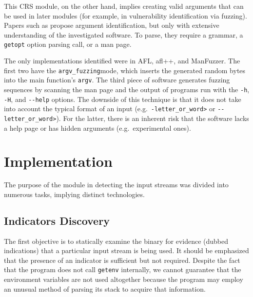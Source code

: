 \documentclass[../main.tex]{subfiles}
\begin{document}
This CRS module, on the other hand, implies creating valid arguments that can
be used in later modules (for example, in vulnerability identification via
fuzzing). Papers such as \cite{cli_fuzzer}\cite{nt_robustness}\cite{power}
propose argument identification, but only with extensive understanding of the
investigated software. To parse, they require a grammar, a \texttt{getopt}
option parsing call, or a man page.

The only implementations identified were in
AFL,
afl++,
and ManFuzzer. The
first two have the \texttt{argv\_fuzzing\textquotesingle{}}mode, which inserts
the generated random bytes into the main function's \texttt{argv}. The third
piece of software generates fuzzing sequences by scanning the man page and the
output of programs run with the \texttt{-h}, \texttt{-H}, and \texttt{-\/-help}
options. The downside of this technique is that it does not take into account
the typical format of an input (e.g.~\texttt{-letter\_or\_word\textgreater{}}
or \texttt{-\/-letter\_or\_word\textgreater{}}). For the latter, there is an
inherent risk that the software lacks a help page or has hidden arguments
(e.g.~experimental ones).

\hypertarget{implementation}{%
  \section{Implementation}\label{implementation}}

The purpose of the module in detecting the input streams was divided into
numerous tasks, implying distinct technologies.

\hypertarget{indicators-discovery}{%
  \subsection{Indicators Discovery}\label{indicators-discovery}}

The first objective is to statically examine the binary for evidence (dubbed
indications) that a particular input stream is being used. It should be
emphasized that the presence of an indicator is sufficient but not required.
Despite the fact that the program does not call \texttt{getenv} internally, we
cannot guarantee that the environment variables are not used altogether because
the program may employ an unusual method of parsing its stack to acquire that
information.
\end{document}
